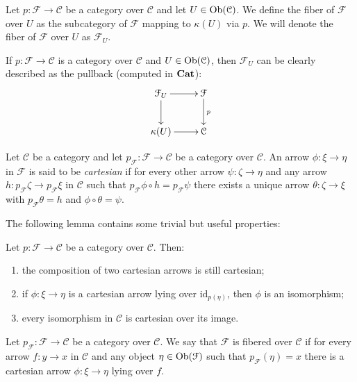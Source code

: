 \begin{refsection}
\begin{defin}
Let $p \colon \mathcal F \to \mathcal C$ be a category over $\mathcal C$ and let $U \in \operatorname{Ob}(\mathcal C)$. We define the fiber of $\mathcal F$ over $U$ as the subcategory of $\mathcal F$ mapping to $\kappa(U)$ via $p$. We will denote the fiber of $\mathcal F$ over $U$ as $\mathcal F_U$.
\end{defin}

\begin{rmk}
If $p \colon \mathcal F \to \mathcal C$ is a category over $\mathcal C$ and $U \in \operatorname{Ob}(\mathcal C)$, then $\mathcal F_U$ can be clearly described as the pullback (computed in $\mathbf{Cat}$):
\[
\xymatrix{
\mathcal F_U \ar[d] \ar[r] & \mathcal F \ar[d]^p \\ \kappa(U) \ar[r] & \mathcal C
}
\]
\end{rmk}

\begin{defin}
Let $\mathcal C$ be a category and let $p_\mathcal{F} \colon \mathcal F \to \mathcal C$ be a category over $\mathcal C$. An arrow $\phi \colon \xi \to \eta$ in $\mathcal F$ is said to be \emph{cartesian} if for every other arrow $\psi \colon \zeta \to \eta$ and any arrow $h \colon p_\mathcal{F} \zeta \to p_{\mathcal F} \xi$ in $\mathcal C$ such that $p_{\mathcal F} \phi \circ h = p_{\mathcal F} \psi$ there exists a unique arrow $\theta \colon \zeta \to \xi$ with $p_{\mathcal F} \theta = h$ and $\phi \circ \theta = \psi$.
\end{defin}

The following lemma contains some trivial but useful properties:

\begin{lemma} \label{lemma cartesian arrows}
Let $p \colon \mathcal F \to \mathcal C$ be a category over $\mathcal C$. Then:
\begin{enumerate}
\item the composition of two cartesian arrows is still cartesian;
\item if $\phi \colon \xi \to \eta$ is a cartesian arrow lying over $\mathrm{id}_{p(\eta)}$, then $\phi$ is an isomorphism;
\item every isomorphism in $\mathcal C$ is cartesian over its image.
\end{enumerate}
\end{lemma}

\begin{defin}
Let $p_{\mathcal F} \colon \mathcal F \to \mathcal C$ be a category over $\mathcal C$. We say that $\mathcal F$ is fibered over $\mathcal C$ if for every arrow $f \colon y \to x$ in $\mathcal C$ and any object $\eta \in \operatorname{Ob}(\mathcal F)$ such that $p_{\mathcal F}(\eta) = x$ there is a cartesian arrow $\phi \colon \xi \to \eta$ lying over $f$.
\end{defin}


\end{refsection}
